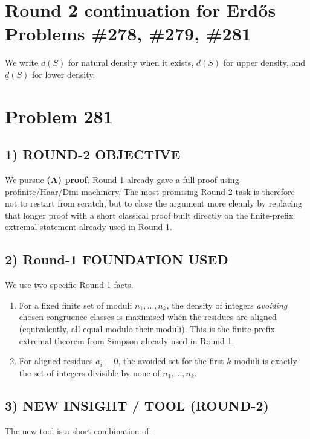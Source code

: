 
\section*{Round 2 continuation for Erd\H{o}s Problems \#278, \#279, \#281}

We write $d(S)$ for natural density when it exists, $\overline d(S)$ for upper density, and $\underline d(S)$ for lower density.

\section*{Problem 281}

\subsection*{1) ROUND-2 OBJECTIVE}

We pursue \textbf{(A) proof}. Round 1 already gave a full proof using profinite/Haar/Dini machinery. The most promising Round-2 task is therefore not to restart from scratch, but to close the argument more cleanly by replacing that longer proof with a short classical proof built directly on the finite-prefix extremal statement already used in Round 1.

\subsection*{2) Round-1 FOUNDATION USED}

We use two specific Round-1 facts.

\begin{enumerate}
\item For a fixed finite set of moduli $n_1,\dots,n_k$, the density of integers \emph{avoiding} chosen congruence classes is maximised when the residues are aligned (equivalently, all equal modulo their moduli). This is the finite-prefix extremal theorem from Simpson already used in Round 1.
\item For aligned residues $a_i\equiv 0$, the avoided set for the first $k$ moduli is exactly the set of integers divisible by none of $n_1,\dots,n_k$.
\end{enumerate}

\subsection*{3) NEW INSIGHT / TOOL (ROUND-2)}

The new tool is a short combination of:

